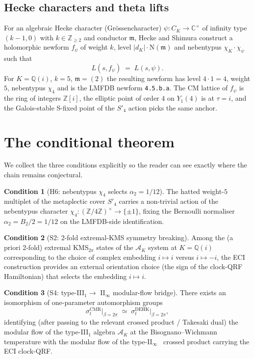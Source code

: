 \documentclass[12pt]{amsart}
\theoremstyle{definition}
\newtheorem{condition}{Condition}
\newcommand{\Z}{\mathbb{Z}}
\newcommand{\Q}{\mathbb{Q}}
\newcommand{\C}{\mathbb{C}}
\newcommand{\CMR}{\mathrm{CMR}}
\newcommand{\DEHK}{\mathrm{DEHK}}
\newcommand{\Norm}{\mathrm{N}}
\newcommand{\lmfdb}[1]{\texttt{#1}}
\begin{document}
\subsection{Hecke characters and theta lifts}
For an algebraic Hecke character (Gr\"ossencharacter)
$\psi : C_K \to \C^\times$ of infinity type $(k-1, 0)$ with
$k \in \Z_{\geq 2}$ and conductor $\mathfrak{m}$, Hecke
\cite{Hecke1937} and Shimura \cite{Shimura1971} construct a
holomorphic newform $f_\psi$ of weight $k$, level $|d_K| \cdot
\Norm(\mathfrak{m})$ and nebentypus $\chi_K \cdot \chi_\psi$ such
that
\[
  L(s, f_\psi) \;=\; L(s, \psi).
\]
For $K = \Q(i)$, $k = 5$, $\mathfrak{m} = (2)$ the resulting
newform has level $4 \cdot 1 = 4$, weight $5$, nebentypus $\chi_4$
and is the LMFDB newform \lmfdb{4.5.b.a}. The CM lattice of
$f_\psi$ is the ring of integers $\Z[i]$, the elliptic point of
order $4$ on $Y_1(4)$ is at $\tau = i$, and the Galois-stable
S-fixed point of the $S'_4$ action picks the same anchor.

\section{The conditional theorem}
\label{sec:thm}

We collect the three conditions explicitly so the reader can see
exactly where the chain remains conjectural.

\begin{condition}[H6: nebentypus $\chi_4$ selects $\alpha_2 = 1/12$]
\label{cond:H6}
The hatted weight-$5$ multiplet of the metaplectic cover $S'_4$
carries a non-trivial action of the nebentypus character $\chi_4 :
(\Z/4\Z)^\times \to \{\pm 1\}$, fixing the Bernoulli normaliser
$\alpha_2 = B_2 / 2 = 1/12$ on the LMFDB-side identification.
\end{condition}

\begin{condition}[S2: 2-fold extremal-KMS symmetry breaking]
\label{cond:S2}
Among the (a priori 2-fold) extremal KMS$_{2\pi}$ states of the
$\mathcal{A}_K$ system at $K = \Q(i)$ corresponding to the choice
of complex embedding $i \mapsto i$ versus $i \mapsto -i$, the ECI
construction provides an external orientation choice (the sign of
the clock-QRF Hamiltonian) that selects the embedding $i \mapsto
i$.
\end{condition}

\begin{condition}[S4: type-III${}_1 \to$ II${}_\infty$
                  modular-flow bridge]
\label{cond:S4}
There exists an isomorphism of one-parameter automorphism groups
\[
  \sigma_{t}^{\CMR}\big|_{\beta = 2\pi}
  \;\simeq\;
  \sigma_{t}^{\DEHK}\big|_{\beta = 2\pi},
\]
identifying (after passing to the relevant crossed product /
Takesaki dual) the modular flow of the type-III${}_1$ algebra
$\mathcal{A}_K$ at the Bisognano--Wichmann temperature with the
modular flow of the type-II${}_\infty$ \DEHK\ crossed product
carrying the ECI clock-QRF.
\end{condition}
\end{document}
